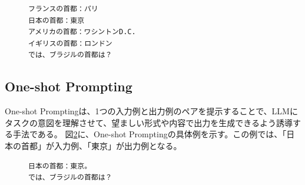 \begin{figure}[tp]
\begin{tcolorbox}[
  colback=white,
  colframe=blue,
  fonttitle=\bfseries,
]
\footnotesize
\ttfamily
\fontsize{10}{11}\selectfont
\begin{verbatim}
フランスの首都：パリ
日本の首都：東京
アメリカの首都：ワシントンD.C.
イギリスの首都：ロンドン
では、ブラジルの首都は？
\end{verbatim}
\end{tcolorbox}
\label{fig:few}
\end{figure}



\subsection{One-shot Prompting}
\label{subsec:one_shot}

One-shot Prompting\cite{oneshot}は、1つの入力例と出力例のペアを提示することで、LLMにタスクの意図を理解させて、望ましい形式や内容で出力を生成できるよう誘導する手法である。
図\ref{fig:one}に、One-shot Promptingの具体例を示す。この例では、「日本の首都」が入力例、「東京」が出力例となる。

\begin{figure}[tp]
\begin{tcolorbox}[
  colback=white,
  colframe=blue,
  fonttitle=\bfseries,
]
\footnotesize
\ttfamily
\fontsize{10}{11}\selectfont
\begin{verbatim}
日本の首都：東京。
では、ブラジルの首都は？
\end{verbatim}
\end{tcolorbox}
\label{fig:one}
\end{figure}

